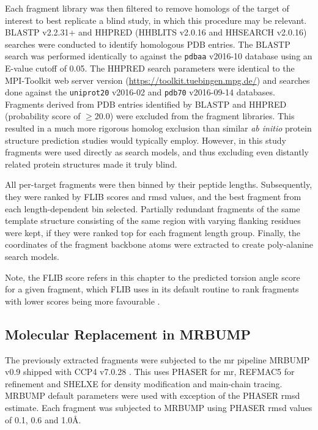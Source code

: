 Each fragment library was then filtered to remove homologs of the target of interest to best replicate a blind study, in which this procedure may be relevant. BLASTP v2.2.31+ \cite{Altschul1990-og,Camacho2009-th} and HHPRED (HHBLITS v2.0.16 and HHSEARCH v2.0.16) \cite{Soding2005-sx} searches were conducted to identify homologous PDB entries. The BLASTP search was performed identically to \textcite{De_Oliveira2015-kb} against the \texttt{pdbaa} v2016-10 database using an E-value cutoff of 0.05. The HHPRED search parameters were identical to the MPI-Toolkit \cite{Biegert2006-cb} web server version (\url{https://toolkit.tuebingen.mpg.de/}) and searches done against the \texttt{uniprot20} v2016-02 and \texttt{pdb70} v2016-09-14 databases. Fragments derived from PDB entries identified by BLASTP and HHPRED (probability score of $\geq20.0$) were excluded from the fragment libraries. This resulted in a much more rigorous homolog exclusion than similar \textit{ab initio} protein structure prediction studies would typically employ. However, in this study fragments were used directly as search models, and thus excluding even distantly related protein structures made it truly blind.

All per-target fragments were then binned by their peptide lengths. Subsequently, they were ranked by FLIB scores and \gls{rmsd} values, and the best fragment from each length-dependent bin selected. Partially redundant fragments of the same template structure consisting of the same region with varying flanking residues were kept, if they were ranked top for each fragment length group. Finally, the coordinates of the fragment backbone atoms were extracted to create poly-alanine search models.

Note, the FLIB score refers in this chapter to the predicted torsion angle score for a given fragment, which FLIB uses in its default routine to rank fragments with lower scores being more favourable \cite{De_Oliveira2015-kb}. 

\subsection{Molecular Replacement in MRBUMP}
The previously extracted fragments were subjected to the \gls{mr} pipeline MRBUMP v0.9 shipped with CCP4 v7.0.28 \cite{Keegan2018-kn}. This uses PHASER \cite{McCoy2007-mp} for \gls{mr}, REFMAC5 \cite{Murshudov2011-ww} for refinement and SHELXE \cite{Thorn2013-le} for density modification and main-chain tracing. MRBUMP default parameters were used with exception of the PHASER \gls{rmsd} estimate. Each fragment was subjected to MRBUMP using PHASER \gls{rmsd} values of 0.1, 0.6 and 1.0\AA.

